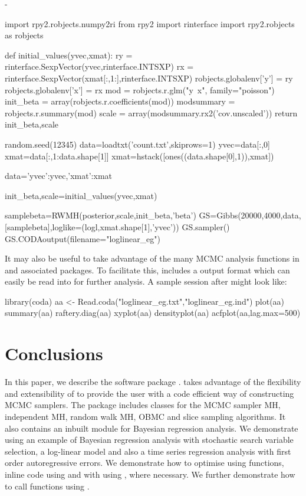 -\documentclass[article]{jss}
\begin{document}
\begin{Code}
import rpy2.robjects.numpy2ri
from rpy2 import rinterface
import rpy2.robjects as robjects

def initial_values(yvec,xmat):
    ry = rinterface.SexpVector(yvec,rinterface.INTSXP)
    rx = rinterface.SexpVector(xmat[:,1:],rinterface.INTSXP)
    robjects.globalenv['y'] = ry
    robjects.globalenv['x'] = rx
    mod = robjects.r.glm("y~x", family="poisson")
    init_beta =  array(robjects.r.coefficients(mod))
    modsummary = robjects.r.summary(mod)
    scale = array(modsummary.rx2('cov.unscaled'))
    return init_beta,scale

random.seed(12345) 
data=loadtxt('count.txt',skiprows=1)
yvec=data[:,0]
xmat=data[:,1:data.shape[1]]
xmat=hstack([ones((data.shape[0],1)),xmat])

data={'yvec':yvec,'xmat':xmat} 

init_beta,scale=initial_values(yvec,xmat)

samplebeta=RWMH(posterior,scale,init_beta,'beta')
GS=Gibbs(20000,4000,data, [samplebeta],loglike=(logl,xmat.shape[1],'yvec'))
GS.sampler()
GS.CODAoutput(filename="loglinear_eg") 

\end{Code}


It may also be useful to take advantage of the many MCMC analysis
functions in  and associated packages. To facilitate this,
 includes a 
\citep{Rnews:Plummer+Best+Cowles+Vines:2006} output format which can
easily be read into  for further analysis. A sample
 session after  might look like:


\begin{Code}
library(coda)
aa <- Read.coda("loglinear_eg.txt","loglinear_eg.ind")
plot(aa)
summary(aa)
raftery.diag(aa)
xyplot(aa)
densityplot(aa)
acfplot(aa,lag.max=500)

\end{Code}



\section{Conclusions}
\label{sec:Conclusions}

In this paper, we describe the  software
package .   takes advantage of the flexibility
and extensibility of  to provide the user with a code
efficient way of constructing MCMC samplers. The  package
includes classes for the MCMC sampler MH, independent MH, random walk
MH, OBMC and slice sampling algorithms.  It also contains an inbuilt
module for Bayesian regression analysis.  We demonstrate 
using an example of Bayesian regression analysis with stochastic
search variable selection, a log-linear model and also a time series
regression analysis with first order autoregressive errors. We
demonstrate how to optimise  using  functions,
inline  code using  and with
 using , where necessary.  We further
demonstrate how to call  functions using .
 
\end{document}
